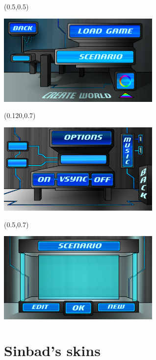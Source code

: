 \documentclass[article]{report}         %
\begin{document}
\begin{textblock}{0.5}(0.5,0.5)

\includegraphics[width=8cm]{images/Menus/menu_play_normal.png}

\end{textblock}

\begin{textblock}{0.5}(0.120,0.7)

\includegraphics[width=8cm]{images/Menus/Menu_Options_normal.png}

\end{textblock}

\begin{textblock}{0.5}(0.5,0.7)

\includegraphics[width=8cm]{images/Menus/Load_Scenario_normal.png}

\end{textblock}

\newpage

      \section{Sinbad's skins}
\end{document}
